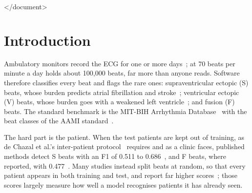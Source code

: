 \documentclass[10pt,a4paper]{article}
\begin{document}
</document>


\section{Introduction}
Ambulatory monitors record the ECG for one or more days~\cite{steinberg2017}; at 70 beats per minute a day holds about 100,000 beats,
far more than anyone reads. Software therefore classifies every beat and flags the rare ones: supraventricular ectopic (S) beats,
whose burden predicts atrial fibrillation and stroke~\cite{binici2010}; ventricular ectopic (V) beats, whose burden goes with a
weakened left ventricle~\cite{baman2010}; and fusion (F) beats. The standard benchmark is the MIT-BIH Arrhythmia
Database~\cite{moody2001} with the beat classes of the AAMI standard~\cite{aami2012ec57}.

The hard part is the patient. When the test patients are kept out of training, as de Chazal et al.'s inter-patient
protocol~\cite{dechazal2004} requires and as a clinic faces, published methods detect S beats with an F1 of 0.511 to
0.686~\cite{dechazal2004,huang2014,zhu2022}, and F beats, where reported, with 0.477~\cite{zhu2022}. Many studies instead split beats
at random, so that every patient appears in both training and test, and report far higher scores~\cite{kwak2024diffusion}; those
scores largely measure how well a model recognises patients it has already seen.
\end{document}
